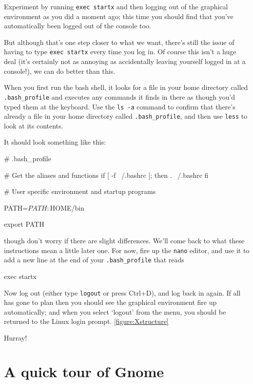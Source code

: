 Experiment by running \texttt{exec startx} and then logging out of the graphical environment as you did a moment ago; this time you should find that you've automatically been logged out of the console too.

But although that's one step closer to what we want, there's still the issue of having to type \texttt{exec startx} every time you log in. Of course this isn't a huge deal (it's certainly not as annoying as accidentally leaving yourself logged in at a console!), we can do better than this. 

When you first run the bash shell, it looks for a file in your home directory called \texttt{.bash\_profile} and executes any commands it finds in there as though you'd typed them at the keyboard. Use the \texttt{ls -a} command to confirm that there's already a file in your home directory called \texttt{.bash\_profile}, and then use \texttt{less} to look at its contents.

It should look something like this:

\begin{ttoutenv}
# .bash_profile

# Get the aliases and functions
if [ -f ~/.bashrc ]; then
	. ~/.bashrc
fi

# User specific environment and startup programs

PATH=$PATH:$HOME/bin

export PATH
\end{ttoutenv}

though don't worry if there are slight differences. We'll come back to what these instructions mean a little later one. For now, fire up the \texttt{nano} editor, and use it to add a new line at the end of your \texttt{.bash\_profile} that reads 

\begin{ttoutenv}
exec startx
\end{ttoutenv}

Now log out (either type \texttt{logout} or press Ctrl+D), and log back in again. If all has gone to plan then you should see the graphical environment fire up automatically; and when you select `logout' from the menu, you should be returned to the Linux login prompt. \ref{figure:Xstructure}

Hurray!

\section{A quick tour of Gnome}

